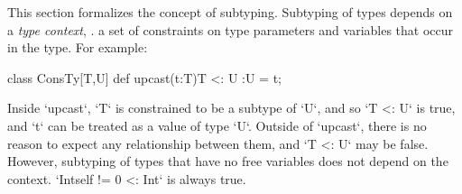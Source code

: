 This section formalizes the concept of subtyping. Subtyping of types depends
on a {\em type context}, \viz. a set of constraints on type parameters
and variables that occur in the type.
For example: 

\begin{xten}
class ConsTy[T,U] {
   def upcast(t:T){T <: U} :U = t;
}
\end{xten}
%
\noindent
Inside \xcd`upcast`, \xcd`T` is constrained to be a subtype of \xcd`U`, and so
\xcd`T <: U` is true, and \xcd`t` can be treated as a value of type \xcd`U`.  
Outside of \xcd`upcast`, there is no reason to expect any relationship between
them, and \xcd`T <: U` may be false.
However, subtyping of types that have no free variables does not depend
on the context.    \xcd`Int{self != 0} <: Int` is always
true.



